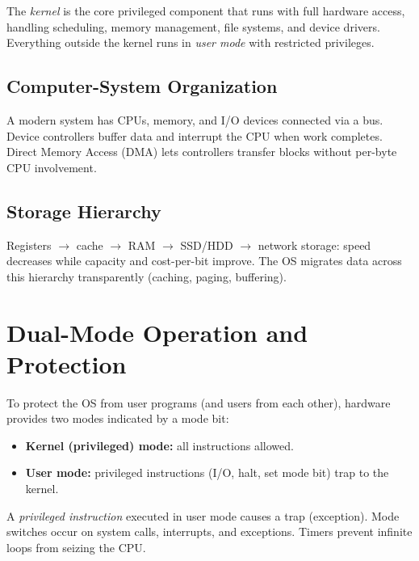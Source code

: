 \begin{definition}[Kernel]
The \emph{kernel} is the core privileged component that runs with full hardware
access, handling scheduling, memory management, file systems, and device drivers.
Everything outside the kernel runs in \emph{user mode} with restricted privileges.
\end{definition}

\subsection{Computer-System Organization}
A modern system has CPUs, memory, and I/O devices connected via a bus. Device
controllers buffer data and interrupt the CPU when work completes. Direct Memory
Access (DMA) lets controllers transfer blocks without per-byte CPU involvement.

\subsection{Storage Hierarchy}
Registers $\to$ cache $\to$ RAM $\to$ SSD/HDD $\to$ network storage: speed
decreases while capacity and cost-per-bit improve. The OS migrates data across
this hierarchy transparently (caching, paging, buffering).

\section{Dual-Mode Operation and Protection}
\label{sec:dual-mode}

To protect the OS from user programs (and users from each other), hardware
provides two modes indicated by a mode bit:

\begin{itemize}
  \item \textbf{Kernel (privileged) mode:} all instructions allowed.
  \item \textbf{User mode:} privileged instructions (I/O, halt, set mode bit)
        trap to the kernel.
\end{itemize}

A \emph{privileged instruction} executed in user mode causes a trap (exception).
Mode switches occur on system calls, interrupts, and exceptions. Timers prevent
infinite loops from seizing the CPU.

